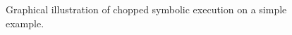 \begin{figure}[t]
  \centering
  \subfloat[]{
    
    \label{fig:simple-main}
  }
  \hspace{10pt}
  \hspace{30pt}
  \subfloat[]{
    
    \label{fig:simple-f}
  }
  \caption{Graphical illustration of chopped symbolic execution on a
    simple example.}
  \label{fig:simple}
\end{figure}


